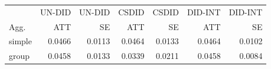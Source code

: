 \begin{tabular}{lrrrrrr}
\hline
 & UN-DID & UN-DID & CSDID & CSDID & DID-INT & DID-INT \\
Agg. & ATT & SE & ATT & SE & ATT & SE \\
\hline
simple & 0.0466 & 0.0113 & 0.0464 & 0.0133 & 0.0464 & 0.0102 \\
group & 0.0458 & 0.0133 & 0.0339 & 0.0211 & 0.0458 & 0.0084 \\
\hline
\end{tabular}

